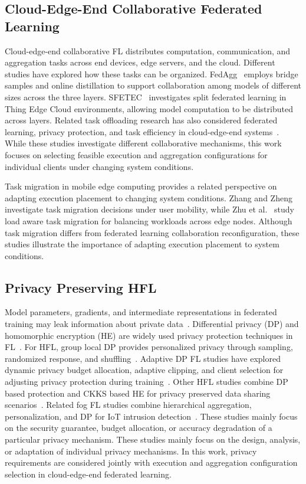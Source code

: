 \documentclass[5p,times]{elsarticle}
\theoremstyle{plain}
\theoremstyle{definition}
\theoremstyle{remark}
\begin{document}
\subsection{Cloud-Edge-End Collaborative Federated Learning}

Cloud-edge-end collaborative FL distributes computation, communication, and aggregation tasks across end devices, edge servers, and the cloud. Different studies have explored how these tasks can be organized. FedAgg~\cite{BSBODP} employs bridge samples and online distillation to support collaboration among models of different sizes across the three layers. SFETEC~\cite{SFETEC} investigates split federated learning in Thing Edge Cloud environments, allowing model computation to be distributed across layers. Related task offloading research has also considered federated learning, privacy protection, and task efficiency in cloud-edge-end systems~\cite{dong2026privacyoffloading}. While these studies investigate different collaborative mechanisms, this work focuses on selecting feasible execution and aggregation configurations for individual clients under changing system conditions.

Task migration in mobile edge computing provides a related perspective on adapting execution placement to changing system conditions. Zhang and Zheng~\cite{ZHANG2019111} investigate task migration decisions under user mobility, while Zhu et al.~\cite{ZHU2024303} study load aware task migration for balancing workloads across edge nodes. Although task migration differs from federated learning collaboration reconfiguration, these studies illustrate the importance of adapting execution placement to system conditions.


\subsection{Privacy Preserving HFL}
Model parameters, gradients, and intermediate representations in federated
training may leak information about private data~\cite{zhu2019dlg}.
Differential privacy (DP) and homomorphic encryption (HE) are widely used
privacy protection techniques in FL~\cite{dwork2006calibrating,cheon2017ckks}.
For HFL, group local DP provides personalized privacy through sampling,
randomized response, and shuffling~\cite{GLDP}.
Adaptive DP FL studies have explored dynamic privacy budget allocation,
adaptive clipping, and client selection for adjusting privacy protection
during training~\cite{xu2025adpfl}.
Other HFL studies combine DP based protection and CKKS based HE for privacy
preserved data sharing scenarios~\cite{PPHFL}.
Related fog FL studies combine hierarchical aggregation, personalization, and DP
for IoT intrusion detection~\cite{islam2025pphffl}.
These studies mainly focus on the security guarantee, budget allocation, or
accuracy degradation of a particular privacy mechanism.
These studies mainly focus on the design, analysis, or adaptation of individual
privacy mechanisms. In this work, privacy requirements are considered jointly
with execution and aggregation configuration selection in cloud-edge-end
federated learning.
\end{document}
